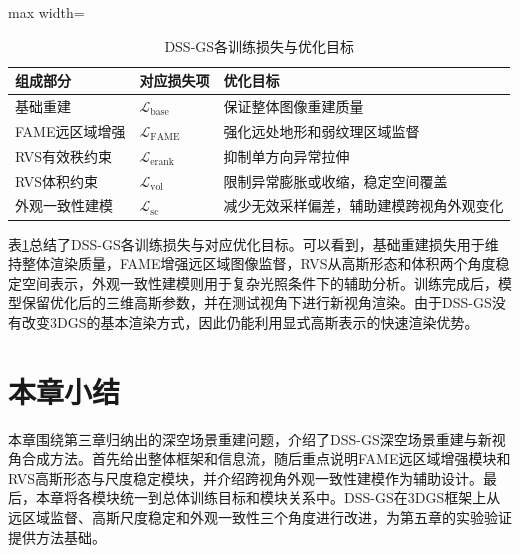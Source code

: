 \begin{table}[H]
    \fontsize{10.5pt}{13.125pt}\selectfont
    \caption{DSS-GS各训练损失与优化目标}
    \centering\label{tab:4-modules}
    \begin{adjustbox}{max width=\textwidth}
        \begin{tabular}{>{\raggedright\arraybackslash}p{}>{\centering\arraybackslash}p{}>{\raggedright\arraybackslash}p{}}
        \toprule
        组成部分 & 对应损失项 & 优化目标 \tabularnewline
        \midrule
        基础重建 & $\mathcal{L}_{\mathrm{base}}$ & 保证整体图像重建质量 \tabularnewline
        FAME远区域增强 & $\mathcal{L}_{\mathrm{FAME}}$ & 强化远处地形和弱纹理区域监督 \tabularnewline
        RVS有效秩约束 & $\mathcal{L}_{\mathrm{erank}}$ & 抑制单方向异常拉伸 \tabularnewline
        RVS体积约束 & $\mathcal{L}_{\mathrm{vol}}$ & 限制异常膨胀或收缩，稳定空间覆盖 \tabularnewline
        外观一致性建模 & $\mathcal{L}_{\mathrm{sc}}$ & 减少无效采样偏差，辅助建模跨视角外观变化 \tabularnewline
        \bottomrule
    \end{tabular}
    \end{adjustbox}
\end{table}

表\ref{tab:4-modules}总结了DSS-GS各训练损失与对应优化目标。可以看到，基础重建损失用于维持整体渲染质量，FAME增强远区域图像监督，RVS从高斯形态和体积两个角度稳定空间表示，外观一致性建模则用于复杂光照条件下的辅助分析。训练完成后，模型保留优化后的三维高斯参数，并在测试视角下进行新视角渲染。由于DSS-GS没有改变3DGS的基本渲染方式，因此仍能利用显式高斯表示的快速渲染优势。

\section{本章小结}

本章围绕第三章归纳出的深空场景重建问题，介绍了DSS-GS深空场景重建与新视角合成方法。首先给出整体框架和信息流，随后重点说明FAME远区域增强模块和RVS高斯形态与尺度稳定模块，并介绍跨视角外观一致性建模作为辅助设计。最后，本章将各模块统一到总体训练目标和模块关系中。DSS-GS在3DGS框架上从远区域监督、高斯尺度稳定和外观一致性三个角度进行改进，为第五章的实验验证提供方法基础。
